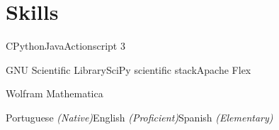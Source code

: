 
\section{Skills}

\begin{cvrows}
	
	{C\dotsep Python\dotsep Java\dotsep Actionscript 3}
	
	{GNU Scientific Library\dotsep SciPy scientific stack\dotsep Apache Flex}
	
	{Wolfram Mathematica}
	
	
	{Portuguese \textit{(Native)}\dotsep English \textit{(Proficient)}\dotsep Spanish \textit{(Elementary)}}
	
\end{cvrows}


\clearsection
